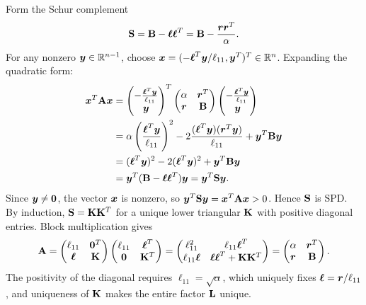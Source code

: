 \documentclass[../main.tex]{subfiles}
\begin{document}
{Form the Schur complement
\begin{align*}
    \mathbf{S} = \mathbf{B} - \boldsymbol{\ell}\boldsymbol{\ell}^T = \mathbf{B} - \frac{\boldsymbol{r}\boldsymbol{r}^T}{\alpha}.
\end{align*}
For any nonzero $\boldsymbol{y} \in \mathbb{R}^{n-1}$, choose $\boldsymbol{x} = (-\boldsymbol{\ell}^T\boldsymbol{y} / \ell_{11}, \boldsymbol{y}^T)^T \in \mathbb{R}^n$. Expanding the quadratic form:
\begin{align*}
    \boldsymbol{x}^T\mathbf{A}\boldsymbol{x}
    &= \begin{pmatrix} -\frac{\boldsymbol{\ell}^T\boldsymbol{y}}{\ell_{11}} \\ \boldsymbol{y} \end{pmatrix}^T
       \begin{pmatrix} \alpha & \boldsymbol{r}^T \\ \boldsymbol{r} & \mathbf{B} \end{pmatrix}
       \begin{pmatrix} -\frac{\boldsymbol{\ell}^T\boldsymbol{y}}{\ell_{11}} \\ \boldsymbol{y} \end{pmatrix} \\
    &= \alpha\left(\frac{\boldsymbol{\ell}^T\boldsymbol{y}}{\ell_{11}}\right)^2 - 2\frac{(\boldsymbol{\ell}^T\boldsymbol{y})(\boldsymbol{r}^T\boldsymbol{y})}{\ell_{11}} + \boldsymbol{y}^T\mathbf{B}\boldsymbol{y} \\
    &= (\boldsymbol{\ell}^T\boldsymbol{y})^2 - 2(\boldsymbol{\ell}^T\boldsymbol{y})^2 + \boldsymbol{y}^T\mathbf{B}\boldsymbol{y} \\
    &= \boldsymbol{y}^T(\mathbf{B} - \boldsymbol{\ell}\boldsymbol{\ell}^T)\boldsymbol{y} = \boldsymbol{y}^T\mathbf{S}\boldsymbol{y}.
\end{align*}
Since $\boldsymbol{y} \neq \mathbf{0}$, the vector $\boldsymbol{x}$ is nonzero, so $\boldsymbol{y}^T\mathbf{S}\boldsymbol{y} = \boldsymbol{x}^T\mathbf{A}\boldsymbol{x} > 0$. Hence $\mathbf{S}$ is SPD. By induction, $\mathbf{S} = \mathbf{K}\mathbf{K}^T$ for a unique lower triangular $\mathbf{K}$ with positive diagonal entries. Block multiplication gives
\begin{align*}
    \mathbf{A} = \begin{pmatrix} \ell_{11} & \mathbf{0}^T \\ \boldsymbol{\ell} & \mathbf{K} \end{pmatrix}
          \begin{pmatrix} \ell_{11} & \boldsymbol{\ell}^T \\ \mathbf{0} & \mathbf{K}^T \end{pmatrix}
        = \begin{pmatrix} \ell_{11}^2 & \ell_{11}\boldsymbol{\ell}^T \\ \ell_{11}\boldsymbol{\ell} & \boldsymbol{\ell}\boldsymbol{\ell}^T + \mathbf{K}\mathbf{K}^T \end{pmatrix}
        = \begin{pmatrix} \alpha & \boldsymbol{r}^T \\ \boldsymbol{r} & \mathbf{B} \end{pmatrix}.
\end{align*}
The positivity of the diagonal requires $\ell_{11} = \sqrt{\alpha}$, which uniquely fixes $\boldsymbol{\ell} = \boldsymbol{r} / \ell_{11}$, and uniqueness of $\mathbf{K}$ makes the entire factor $\mathbf{L}$ unique.
}
\end{document}
